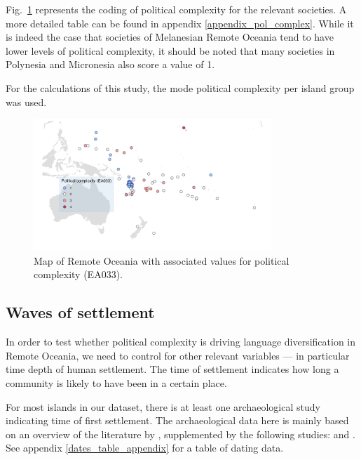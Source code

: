\documentclass[unnumsec,webpdf,modern,medium]{oup-authoring-template}
\begin{document}
\begin{appendices}
Fig.~\ref{pol_complex_map} represents the coding of political complexity for the relevant societies. A more detailed table can be found in appendix \ref{appendix_pol_complex}. While it is indeed the case that societies of Melanesian Remote Oceania tend to have lower levels of political complexity, it should be noted that many societies in Polynesia and Micronesia also score a value of 1.

For the calculations of this study, the mode political complexity per island group was used. 

\begin{figure}
\centering
\includegraphics[width=0.8\textwidth]{map_pol_complex}
\caption[Map of Remote Oceania: Political complexity]{{Map of Remote Oceania with associated values for political complexity (EA033).}}
\label{pol_complex_map}
\end{figure}


\FloatBarrier
\subsection{Waves of settlement}
\label{appendix_def_dates}
In order to test whether political complexity is driving language diversification in Remote Oceania, we need to control for other relevant variables --- in particular time depth of human settlement. The time of settlement indicates how long a community is likely to have been in a certain place. 

For most islands in our dataset, there is at least one archaeological study indicating time of first settlement. The archaeological data here is mainly based on an overview of the literature by \citet{rieth_cochrane_2018}, supplemented by the following studies: \citet{intoh2007reconnaissance, intoh2008ongoing, carson2012recent, kirch2012basline, Napolitano_et_al_yap, ellis2012saipan} and \citet{levin_seikel_miles_2019}. See appendix \ref{dates_table_appendix} for a table of dating data.


\end{appendices}
\end{document}
